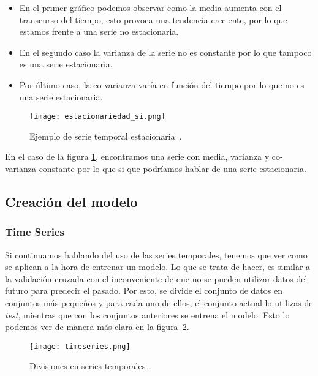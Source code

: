 \begin{itemize}
	\item En el primer gráfico podemos observar como la media aumenta con el transcurso del tiempo, esto provoca una tendencia creciente, por lo que estamos frente a una serie no estacionaria.
	\item En el segundo caso la varianza de la serie no es constante por lo que tampoco es una serie estacionaria.
	\item Por último caso, la co-varianza varía en función del tiempo por lo que no es una serie estacionaria. 
\end{itemize}

\begin{figure}%
	\centering
	\texttt{[image: estacionariedad\_si.png]}
	\caption[Ejemplo de serie temporal estacionaria]{Ejemplo de serie temporal estacionaria~\cite{SeriesTempIMG}.}\label{serie_si_estacionaria}
\end{figure}

En el caso de la figura \ref{serie_si_estacionaria}, encontramos una serie con media, varianza y co-varianza constante por lo que si que podríamos hablar de una serie estacionaria. 

\subsection{Creación del modelo}

\subsubsection{Time Series}\label{series_temporales_titutlo}
Si continuamos hablando del uso de las series temporales, tenemos que ver como se aplican a la hora de entrenar un modelo. Lo que se trata de hacer, es similar a la validación cruzada con el inconveniente de que no se pueden utilizar datos del futuro para predecir el pasado. Por esto, se divide el conjunto de datos en conjuntos más pequeños y para cada uno de ellos, el conjunto actual lo utilizas de \emph{test}, mientras que con los conjuntos anteriores se entrena el modelo. Esto lo podemos ver de manera más clara en la figura~\ref{timeseriesimage}.

\begin{figure}%
	\centering
	\texttt{[image: timeseries.png]}
	\caption[Divisiones en series temporales]{Divisiones en series temporales~\cite{timeseriesimage}.}\label{timeseriesimage}
\end{figure}

